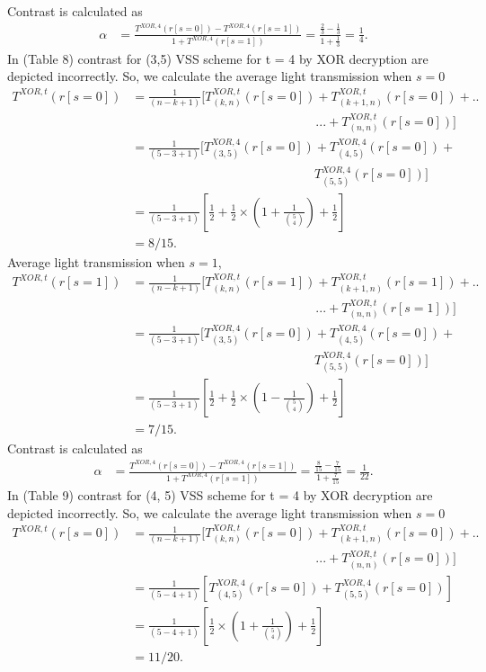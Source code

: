 Contrast is calculated as  
\begin{align*}
\alpha &= \frac{T^{XOR,4}(r[s=0]) - T^{XOR,4}(r[s=1])}{1 +T^{XOR,4}(r[s=1])}
= \frac{\frac{2}{3}-\frac{1}{3}}{1+\frac{1}{3}} =  \frac{1}{4}. 
\end{align*}
In \cite{Wu201348}(Table 8) contrast for (3,5) VSS scheme for t = 4 by XOR decryption are depicted incorrectly. So, we calculate the average light transmission when $s=0$
\begin{align*}
T^{XOR,t}(r[s=0]) &= \frac{1}{(n-k+1)} [T^{XOR,t}_{(k,n)} (r[s=0]) + T^{XOR,t}_{(k+1,n)} (r[s=0]) + ..\\&\phantom{{}=\frac{1}{(n-k+1)} [T^{XOR,t}_{(k,n)} (r[s=0])}... + T^{XOR,t}_{(n,n)} (r[s=0])]\\
&=\frac{1}{(5-3+1)} [T^{XOR,4}_{(3,5)} (r[s=0]) + T^{XOR,4}_{(4,5)} (r[s=0])+\\&\phantom{{}=\frac{1}{(5-3+1)} [T^{XOR,4}_{(3,5)} (r[s=0])} T^{XOR,4}_{(5,5)} (r[s=0])]\\
&=\frac{1}{(5-3+1)} [\frac {1}{2} + \frac {1}{2} \times (1 + \frac {1}{\binom 54})+\frac {1}{2} ]\\
&= 8/15.
\end{align*}
Average light transmission when $s=1$,
\begin{align*}
T^{XOR,t}(r[s=1]) &= \frac{1}{(n-k+1)} [T^{XOR,t}_{(k,n)} (r[s=1]) + T^{XOR,t}_{(k+1,n)} (r[s=1]) +  ..\\&\phantom{{}=\frac{1}{(n-k+1)} [T^{XOR,t}_{(k,n)} (r[s=1])}... + T^{XOR,t}_{(n,n)} (r[s=1])]\\
&=\frac{1}{(5-3+1)} [T^{XOR,4}_{(3,5)} (r[s=0]) + T^{XOR,4}_{(4,5)} (r[s=0])+\\&\phantom{{}=\frac{1}{(5-3+1)} [T^{XOR,4}_{(3,5)} (r[s=0])} T^{XOR,4}_{(5,5)} (r[s=0])]\\
&=\frac{1}{(5-3+1)} [\frac {1}{2} + \frac {1}{2} \times (1 - \frac {1}{\binom 54})+\frac {1}{2} ]\\
&= 7/15.
\end{align*}
Contrast is calculated as  
\begin{align*}
\alpha &= \frac{T^{XOR,4}(r[s=0]) - T^{XOR,4}(r[s=1])}{1 +T^{XOR,4}(r[s=1])} = \frac{\frac{8}{15}-\frac{7}{15}}{1+\frac{7}{15}} = \frac{1}{22}. 
\end{align*}
In \cite{Wu201348}(Table 9) contrast for (4, 5) VSS scheme for t = 4 by XOR decryption are depicted incorrectly. So, we calculate the average light transmission when $s=0$
\begin{align*}
T^{XOR,t}(r[s=0]) &= \frac{1}{(n-k+1)} [T^{XOR,t}_{(k,n)} (r[s=0]) + T^{XOR,t}_{(k+1,n)} (r[s=0]) +  ..\\&\phantom{{}=\frac{1}{(n-k+1)} [T^{XOR,t}_{(k,n)} (r[s=0])}... + T^{XOR,t}_{(n,n)} (r[s=0])]\\
&=\frac{1}{(5-4+1)} [T^{XOR,4}_{(4,5)} (r[s=0]) +  T^{XOR,4}_{(5,5)} (r[s=0])]\\
&=\frac{1}{(5-4+1)} [ \frac {1}{2} \times (1 + \frac {1}{\binom 54})+\frac {1}{2} ]\\
&= 11/20.
\end{align*}
